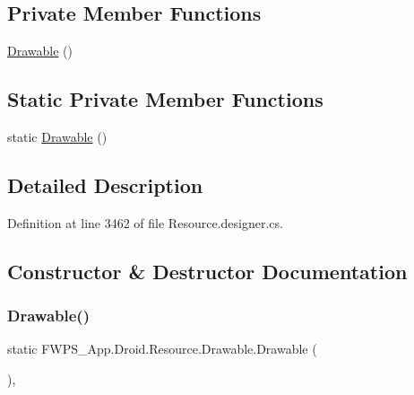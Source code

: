 \subsection*{Private Member Functions}
\begin{DoxyCompactItemize}
\item 
\mbox{\hyperlink{class_f_w_p_s___app_1_1_droid_1_1_resource_1_1_drawable_ac0d1f974d6f3b68e9be3dcb5941fceeb}{Drawable}} ()
\end{DoxyCompactItemize}
\subsection*{Static Private Member Functions}
\begin{DoxyCompactItemize}
\item 
static \mbox{\hyperlink{class_f_w_p_s___app_1_1_droid_1_1_resource_1_1_drawable_ae3e5c6cdd204d98757176ac125b7cba9}{Drawable}} ()
\end{DoxyCompactItemize}


\subsection{Detailed Description}


Definition at line 3462 of file Resource.\+designer.\+cs.



\subsection{Constructor \& Destructor Documentation}
\mbox{\label{class_f_w_p_s___app_1_1_droid_1_1_resource_1_1_drawable_ae3e5c6cdd204d98757176ac125b7cba9}} 
\subsubsection{\texorpdfstring{Drawable()}{Drawable()}\hspace{0.1cm}{\footnotesize\ttfamily [1/2]}}
{\footnotesize\ttfamily static F\+W\+P\+S\+\_\+\+App.\+Droid.\+Resource.\+Drawable.\+Drawable (\begin{DoxyParamCaption}{ }\end{DoxyParamCaption})\hspace{0.3cm}{\ttfamily [static]}, {\ttfamily [private]}}



